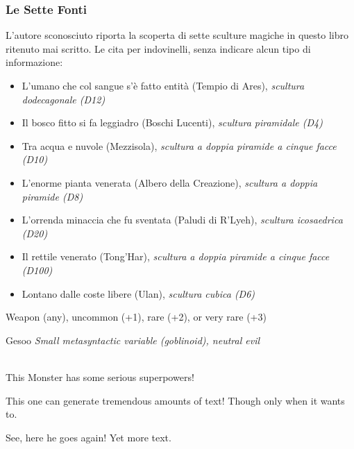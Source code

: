 \documentclass[10pt,twoside,onecolumn,openany]{book}
\begin{document}
\subsubsection{Le Sette Fonti} L'autore sconosciuto riporta la scoperta di sette sculture magiche in questo libro ritenuto mai scritto. Le cita per indovinelli, senza indicare alcun tipo di informazione:
\begin{multicols}{2}
\begin{itemize}
\item L'umano che col sangue s'è fatto entità (Tempio di Ares), \textit{scultura dodecagonale (D12)}
\item Il bosco fitto si fa leggiadro (Boschi Lucenti), \textit{scultura piramidale (D4)}
\item Tra acqua e nuvole (Mezzisola), \textit{scultura a doppia piramide a cinque facce (D10)}
\item L'enorme pianta venerata (Albero della Creazione), \textit{scultura a doppia piramide (D8)}
\item L'orrenda minaccia che fu sventata (Paludi di R'Lyeh), \textit{scultura icosaedrica (D20)}
\item Il rettile venerato (Tong'Har), \textit{scultura a doppia piramide a cinque facce (D100)}
\item Lontano dalle coste libere (Ulan), \textit{scultura cubica (D6)}
\end{itemize}
\end{multicols}
\newpage
{Weapon (any), uncommon (+1), rare (+2), or very rare (+3)}
\begin{monsterbox}{Gesoo}
	\textit{Small metasyntactic variable (goblinoid), neutral evil}\\
	\hline
	\basics[%
	armorclass = 12,
	hitpoints  = 16 (3d8 + 3),
	speed      = 50 ft
	]
	\hline
	\stats[
    STR = \stat{12}, %
    DEX = \stat{7}
	]
	\hline
	\details[%
	languages = {Common Lisp, Erlang},
	]
	\hline \\[1mm]
	\begin{monsteraction}
		This Monster has some serious superpowers!
	\end{monsteraction}
	\begin{monsteraction}
		This one can generate tremendous amounts of text! Though only when it wants to.
	\end{monsteraction}

	\begin{monsteraction}
    See, here he goes again! Yet more text.
	\end{monsteraction}
\end{monsterbox}
\end{document}
